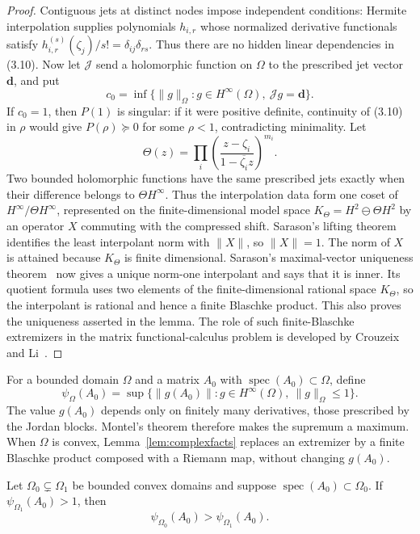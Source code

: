 \documentclass[preprints,article,submit,oneauthor]{Definitions/mdpi}
\numberwithin{equation}{section}
\newcommand{\spec}{\operatorname{spec}}
\begin{document}
\begin{proof}
Contiguous jets at distinct nodes impose independent
conditions: Hermite interpolation supplies polynomials \(h_{i,r}\) whose
normalized derivative functionals satisfy
\(h_{i,r}^{(s)}(\zeta_j)/s!=\delta_{ij}\delta_{rs}\).  Thus there are no hidden
linear dependencies in (3.10).  Now let \(\mathcal J\) send a holomorphic
function on \(\Omega\) to the prescribed jet vector \(\mathbf d\), and put
\[
 c_0=\inf\{\|g\|_\Omega:g\in H^\infty(\Omega),\ \mathcal Jg=\mathbf d\}.
\]
If \(c_0=1\), then \(P(1)\) is singular: if it were positive definite,
continuity of (3.10) in \(\rho\) would give \(P(\rho)\succeq0\) for some
\(\rho<1\), contradicting minimality.  Let
\[
 \Theta(z)=\prod_i
 \left(\frac{z-\zeta_i}{1-\overline{\zeta_i}z}\right)^{m_i}.
\]
Two bounded holomorphic functions have the same prescribed jets exactly when
their difference belongs to \(\Theta H^\infty\).  Thus the interpolation data
form one coset of \(H^\infty/\Theta H^\infty\), represented on the
finite-dimensional model space
\(K_\Theta=H^2\ominus\Theta H^2\) by an operator \(X\) commuting with the
compressed shift.  Sarason's lifting theorem identifies the least interpolant
norm with \(\|X\|\), so \(\|X\|=1\).  The norm of \(X\) is attained because
\(K_\Theta\) is finite dimensional.  Sarason's maximal-vector uniqueness
theorem~\cite[Proposition~5.1]{Sarason1967} now gives a unique norm-one
interpolant and says that it is inner.  Its quotient formula uses two elements
of the finite-dimensional rational space \(K_\Theta\), so the interpolant is
rational and hence a finite Blaschke product.  This also proves the uniqueness
asserted in the lemma.  The role of such finite-Blaschke extremizers in the
matrix functional-calculus problem is developed by
Crouzeix~\cite{Crouzeix2004} and Li~\cite{Li2020}.
\end{proof}

For a bounded domain \(\Omega\) and a matrix \(A_0\) with
\(\spec(A_0)\subset\Omega\), define
\[
 \psi_\Omega(A_0)=\sup\{\|g(A_0)\|:g\in H^\infty(\Omega),\
                         \|g\|_\Omega\leq1\}.
\]
The value \(g(A_0)\) depends only on finitely many derivatives, those prescribed
by the Jordan blocks.  Montel's theorem therefore makes the supremum a
maximum.  When \(\Omega\) is convex, Lemma~\ref{lem:complexfacts} replaces an
extremizer by a finite Blaschke product composed with a Riemann map, without
changing \(g(A_0)\).

\begin{Lemma}\label{lem:strict-domain}
Let \(\Omega_0\subsetneq\Omega_1\) be bounded convex domains and suppose
\(\spec(A_0)\subset\Omega_0\).  If \(\psi_{\Omega_1}(A_0)>1\), then
\[
 \psi_{\Omega_0}(A_0)>\psi_{\Omega_1}(A_0).
\]
\end{Lemma}
\end{document}
